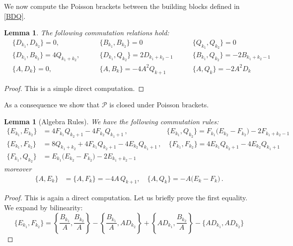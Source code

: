 \documentclass[reqno,11pt]{amsart}
\theoremstyle{plain}
\numberwithin{equation}{section}
\newtheorem{lemma}[theorem]{Lemma}
\begin{document}
{We now compute the Poisson brackets between the building blocks defined in \ref{BDQ}.
\begin{lemma}\label{relations1}
The following  commutation relations hold:
\begin{equation}
	\begin{aligned}
		&\{D_{k_1},D_{k_2}\}=0,\quad\quad&\{B_{k_1},B_{k_2}\}=0\quad\quad&\{Q_{k_1},Q_{k_2}\}=0\\
		&\{D_{k_1},B_{k_2}\}=4Q_{k_1+k_2},\quad\quad&\{D_{k_1},Q_{k_2}\}=2D_{k_1+k_2-1}\quad\quad&\{B_{k_1},Q_{k_2}\}=-2B_{k_1+k_2-1}\\
		&\{A,D_{k}\}=0,\quad\quad&\{A,B_{k}\}=-4A^2Q_{k+1}\quad\quad&\{A,Q_{k}\}=-2A^2D_k
	\end{aligned}
\end{equation}
\end{lemma}
\begin{proof}
This is a simple direct computation.
\end{proof}
As a consequence we show that $\mathscr{P}$ is closed under Poisson brackets.
\begin{lemma}[Algebra Rules]\label{algebra}	We have the following commutation rules: 
\begin{align*}
	\{E_{k_1},E_{k_2}\} &= 4F_{k_1}Q_{k_2+1}-4F_{k_2}Q_{k_1+1} \,,\quad\qquad\quad\quad\;\;
	\{E_{k_1},Q_{k_2}\} = F_{k_1}\big(E_{k_2}-F_{k_2}\big)-2F_{k_1+k_2-1} 
	\\[4pt]
	\{E_{k_1},F_{k_2}\} &= 8Q_{k_1+k_2}+4F_{k_1}Q_{k_2+1}-4E_{k_2}Q_{k_1+1} \,,\quad 
	\{F_{k_1},F_{k_2}\} = 4E_{k_1}Q_{k_2+1}-4E_{k_2}Q_{k_1+1} 
	\\[4pt]
	\{F_{k_1},Q_{k_2}\} &= E_{k_1}\big(E_{k_2}-F_{k_2}\big)-2E_{k_1+k_2-1} 
\end{align*}
moreover
\begin{align}
	\{A,E_{k}\} &= \{A,F_{k}\} = -4A\,Q_{k+1} ,\quad 
	\{A,Q_{k}\} =  -A\big(E_{k}-F_{k}\big)\,. %
\end{align}
\end{lemma}
\begin{proof}
This is again a direct computation. Let us briefly prove the first equality. We expand by bilinearity:
\begin{equation}
	\{E_{k_1}, F_{k_2}\} = \left\{ \frac{B_{k_1}}{A}, \frac{B_{k_2}}{A} \right\} - \left\{ \frac{B_{k_1}}{A}, A D_{k_2} \right\} + \left\{ A D_{k_1}, \frac{B_{k_2}}{A} \right\} - \{A D_{k_1}, A D_{k_2}\}
\end{equation}


\end{proof}}
\end{document}
